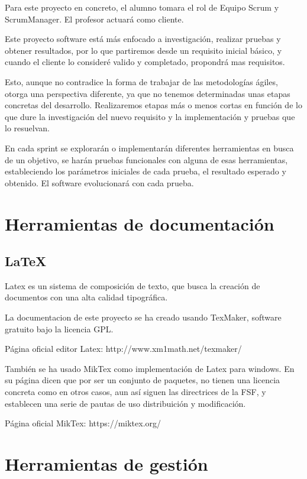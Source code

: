 Para este proyecto en concreto, el alumno tomara el rol de Equipo Scrum y ScrumManager. El profesor actuará como cliente.

Este proyecto software está más enfocado a investigación, realizar pruebas y obtener resultados, por lo que partiremos desde un requisito inicial básico, y cuando el cliente lo consideré valido y completado, propondrá mas requisitos. 

Esto, aunque no contradice la forma de trabajar de las metodologías ágiles, otorga una perspectiva diferente, ya que no tenemos determinadas unas etapas concretas del desarrollo. Realizaremos etapas más o menos cortas en función de lo que dure la investigación del nuevo requisito y la implementación y pruebas que lo resuelvan.

En cada sprint se explorarán o implementarán diferentes herramientas en busca de un objetivo, se harán pruebas funcionales con alguna de esas herramientas, estableciendo los parámetros iniciales de cada prueba, el resultado esperado y obtenido. El software evolucionará con cada prueba.

\section{Herramientas de documentación}

\subsection{LaTeX}

Latex es un sistema de composición de texto, que busca la creación de documentos con una alta calidad tipográfica.

La documentacion de este proyecto se ha creado usando TexMaker, software gratuito bajo la licencia GPL.

Página oficial editor Latex: http://www.xm1math.net/texmaker/

También se ha usado MikTex como implementación de Latex para windows. En su página dicen que por ser un conjunto de paquetes, no tienen una licencia concreta como en otros casos, aun así siguen las directrices de la FSF, y establecen una serie de pautas de uso distribuición y modificación.

Página oficial MikTex: https://miktex.org/

\section{Herramientas de gestión}

